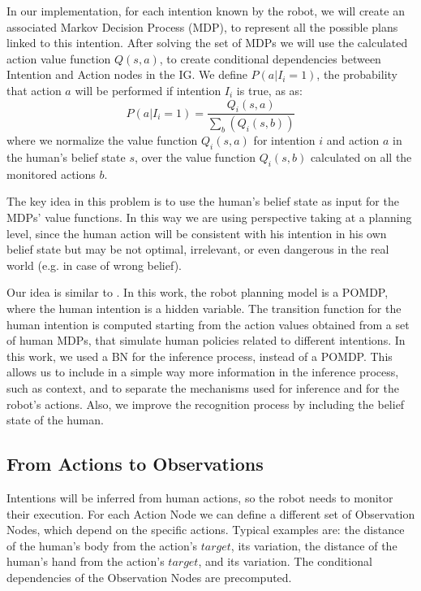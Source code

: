 In our implementation, for each intention known by the robot, we will create an associated Markov Decision Process (MDP), to represent all the possible plans linked to this intention. After solving the set of MDPs we will use the calculated action value function \(Q(s,a)\), to create conditional dependencies between Intention and Action nodes in the IG. We define \(P(a|I_i=1)\), the probability that action $a$ will be performed if intention $I_i$ is true, as as:
\begin{equation}
 P(a|I_i=1)=\frac{Q_i(s,a)}{\sum_b(Q_i(s,b))}
\end{equation}
  where we normalize the value function $Q_i(s,a)$ for intention $i$ and action $a$ in the human's belief state $s$, over the value function $Q_i(s,b)$ calculated on all the monitored actions $b$. 


The key idea in this problem is to use the human's belief state as input for the MDPs' value functions. In this way we are using perspective taking at a planning level, since the human action will be consistent with his intention in his own belief state but may be not optimal, irrelevant, or even dangerous in the real world (e.g. in case of wrong belief).

Our idea is similar to \cite{karami2010human}. In this work, the robot planning model is a POMDP, where the human intention is a hidden variable. The transition function for the human intention is computed starting from the action values obtained from a set of human MDPs, that simulate human policies related to different intentions. In this work, we used a BN for the inference process, instead of a POMDP. This allows us to include in a simple way more information in the inference process, such as context, and to separate the mechanisms used for inference and for the robot's actions. Also, we improve the recognition process by including the belief state of the human.

\subsection{From Actions to Observations}
Intentions will be inferred from human actions, so the robot needs to monitor their execution. For each Action Node we can define a different set of Observation Nodes, which depend on the specific actions. Typical examples are: the distance of the human's body from the action's $target$, its variation, the distance of the human's hand from the action's $target$, and its variation. The conditional dependencies of the Observation Nodes are precomputed.

